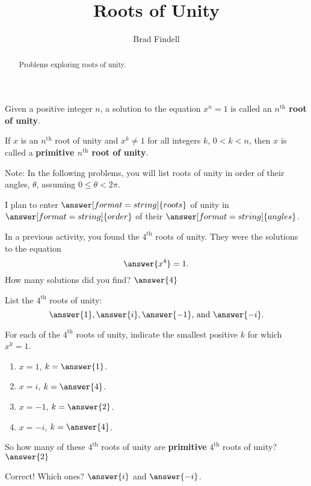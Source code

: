 \documentclass[space,nooutcomes]{ximera}
\title{Roots of Unity}
\author{Brad Findell}
\begin{document}
\begin{abstract}
Problems exploring roots of unity.   
\end{abstract}
\maketitle


\begin{definition}
Given a positive integer $n$, a solution to the equation $x^n=1$ is called an \textbf{$n^\text{th}$  root of unity}.    

If $x$ is an $n^\text{th}$ root of unity and $x^k\ne 1$ for all integers $k$, $0<k<n$, then $x$ is called a \textbf{primitive $n^\text{th}$ root of unity}.
\end{definition}

\begin{question}
Note: In the following problems, you will list roots of unity in order of their angles, $\theta$, assuming $0\le \theta<2\pi$.  

I plan to enter $\answer[format=string]{roots}$ of unity in $\answer[format=string]{order}$ of their $\answer[format=string]{angles}$.
\end{question}
 
\begin{problem}
In a previous activity, you found the $4^\text{th}$ roots of unity.  They were the solutions to the equation
\[
\answer{x^4} = 1.  
\]
How many solutions did you find?  $\answer{4}$
\begin{problem}
List the $4^\text{th}$ roots of unity: 
\[
\answer{1}, \answer{i}, \answer{-1}\text{, and }\answer{-i}. 
\]
\begin{problem}
For each of the $4^\text{th}$ roots of unity, indicate the smallest positive $k$ for which $x^k = 1$.  
\begin{enumerate}
\item $x=1$, $k=\answer{1}$.  
\item $x=i$, $k=\answer{4}$.
\item $x=-1$, $k=\answer{2}$.  
\item $x=-i$, $k=\answer{4}$.
\end{enumerate}
So how many of these $4^\text{th}$ roots of unity are \textbf{primitive} $4^\text{th}$ roots of unity?  
$\answer{2}$
\begin{problem}
Correct!  Which ones?  $\answer{i}$ and $\answer{-i}$.  
\end{problem}
\end{problem}
\end{problem}
\end{problem}
\end{document}
